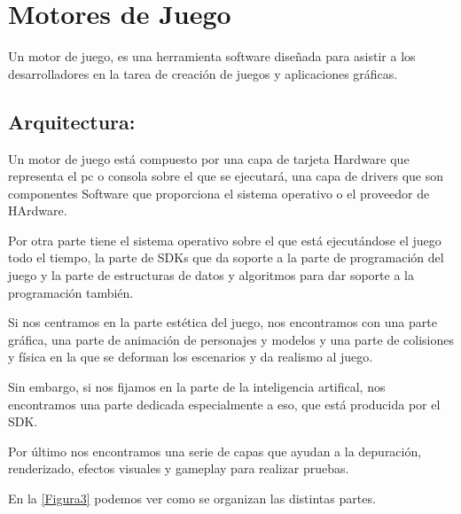 \chapter[Motores de Juego]{\label{identificadorReferenciaCruzada}
Motores de Juego}


Un motor de juego, es una herramienta software diseñada para asistir a los desarrolladores en la tarea de creación de juegos y aplicaciones gráficas.\cite{B9}

\section{Arquitectura:}

Un motor de juego está compuesto por una capa de tarjeta Hardware que representa el pc o consola sobre el que se ejecutará, una capa de drivers que son componentes Software que proporciona el sistema operativo o el proveedor de HArdware.

Por otra parte tiene el sistema operativo sobre el que está ejecutándose el juego todo el tiempo, la parte de SDKs que da soporte a la parte de programación del juego y la parte de estructuras de datos y algoritmos para dar soporte a la programación también.

Si nos centramos en la parte estética del juego, nos encontramos con una parte gráfica, una parte de animación de personajes y modelos y una parte de colisiones y física en la que se deforman los escenarios y da realismo al juego.

Sin embargo, si nos fijamos en la parte de la inteligencia artifical, nos encontramos una parte dedicada especialmente a eso, que está producida por el SDK.

Por último nos encontramos una serie de capas que ayudan a la depuración, renderizado, efectos visuales y gameplay para realizar pruebas.

En la \ref{Figura3} podemos ver como se organizan las distintas partes.

